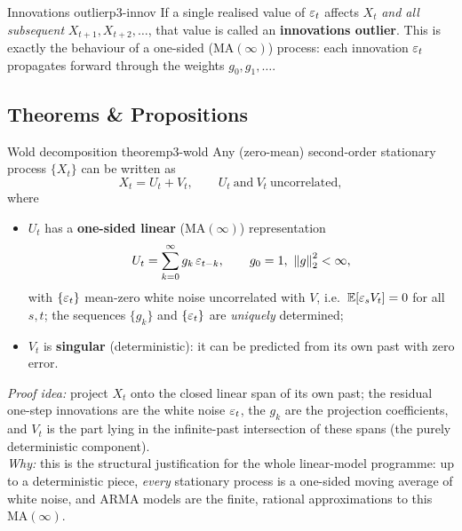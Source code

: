 \begin{definition}{Innovations outlier}{p3-innov}
If a single realised value of $\varepsilon_t$ affects $X_t$ \emph{and all subsequent}
$X_{t+1},X_{t+2},\dots$, that value is called an \textbf{innovations outlier}.
This is exactly the behaviour of a one-sided ($\mathrm{MA}(\infty)$) process:
each innovation $\varepsilon_t$ propagates forward through the weights $g_0,g_1,\dots$.
\end{definition}

\subsection{Theorems \& Propositions}

\begin{theorem}{Wold decomposition theorem}{p3-wold}
Any (zero-mean) second-order stationary process $\{X_t\}$ can be written as
\[
X_t = U_t + V_t,
\qquad U_t\ \text{and}\ V_t\ \text{uncorrelated},
\]
where
\begin{itemize}
  \item $U_t$ has a \textbf{one-sided linear} ($\mathrm{MA}(\infty)$)
        representation
        \[
        U_t=\sum_{k=0}^{\infty}g_k\,\varepsilon_{t-k},\qquad g_0=1,\ \left\lVert g \right\rVert_2^2<\infty,
        \]
        with $\{\varepsilon_t\}$ mean-zero white noise uncorrelated with $V$,
        i.e.\ $\mathbb{E}[\varepsilon_s V_t]=0$ for all $s,t$; the sequences $\{g_k\}$ and
        $\{\varepsilon_t\}$ are \emph{uniquely} determined;
  \item $V_t$ is \textbf{singular} (deterministic): it can be predicted from its
        own past with zero error.
\end{itemize}
\textit{Proof idea:} project $X_t$ onto the closed linear span of its own past;
the residual one-step innovations are the white noise $\varepsilon_t$, the $g_k$ are the
projection coefficients, and $V_t$ is the part lying in the infinite-past
intersection of these spans (the purely deterministic component).\\
\textit{Why:} this is the structural justification for the whole linear-model
programme: up to a deterministic piece, \emph{every} stationary process is a
one-sided moving average of white noise, and ARMA models are the finite,
rational approximations to this $\mathrm{MA}(\infty)$.
\end{theorem}

